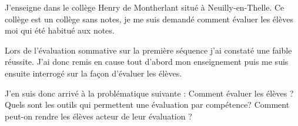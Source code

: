 
J'enseigne dans le collège Henry de Montherlant situé à Neuilly-en-Thelle.
Ce collège est un collège sans notes, je me suis demandé comment évaluer les élèves moi qui été habitué aux notes.

Lors de l'évaluation sommative sur la première séquence j'ai constaté une faible réussite. J'ai donc remis en cause tout d'abord mon enseignement puis me suis ensuite interrogé sur la façon d'évaluer les élèves.

J'en suis donc arrivé à la problématique suivante : 
Comment évaluer les élèves ?
Quels sont les outils qui permettent une évaluation par compétence?
Comment peut-on rendre les élèves acteur de leur évaluation ?

